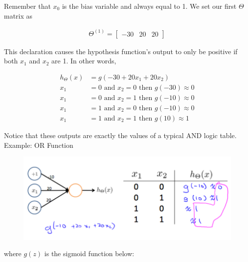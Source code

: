     \noindent Remember that $x_0$ is the bias variable and always equal to 1. We set our first $\Theta$
    matrix as

    \begin{align*}
        \Theta^{(1)} = \begin{bmatrix}
                           -30 & 20 & 20
        \end{bmatrix}
    \end{align*}

    \noindent This declaration causes the hypothesis function's output to only be positive if both $x_1$
    and $x_2$ are 1. In other words,

    \begin{align*}
        h_{\Theta}(x)   &= g(-30+20x_1 + 20x_2) \\
        x_1             &= 0 \text{ and } x_2=0 \text{ then } g(-30)\approx 0 \\
        x_1             &= 0 \text{ and } x_2=1 \text{ then } g(-10)\approx 0 \\
        x_1             &= 1 \text{ and } x_2=0 \text{ then } g(-10)\approx 0 \\
        x_1             &= 1 \text{ and } x_2=1 \text{ then } g(10)\approx 1
    \end{align*}

    \noindent Notice that these outputs are exactly the values of a typical AND logic table. \\

    \noindent Example: OR Function

    \begin{figure}[hbt!]
        \centering
        \includegraphics[scale=0.6]{Resources/OR_Net}
    \end{figure}

    \pagebreak
    \noindent where $g(z)$ is the sigmoid function below:

